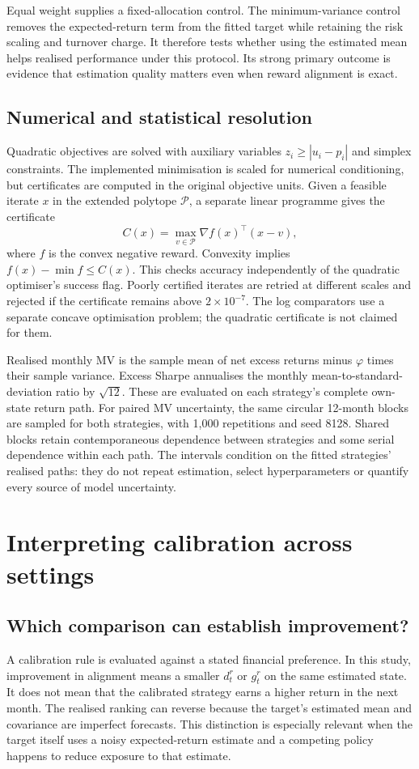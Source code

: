 \documentclass[sigconf,anonymous,review]{acmart}
\begin{document}
Equal weight supplies a fixed-allocation control. The minimum-variance control removes the expected-return term from the fitted target while retaining the risk scaling and turnover charge. It therefore tests whether using the estimated mean helps realised performance under this protocol. Its strong primary outcome is evidence that estimation quality matters even when reward alignment is exact.

\subsection{Numerical and statistical resolution}
Quadratic objectives are solved with auxiliary variables $z_i\ge |u_i-p_i|$ and simplex constraints. The implemented minimisation is scaled for numerical conditioning, but certificates are computed in the original objective units. Given a feasible iterate $x$ in the extended polytope $\mathcal P$, a separate linear programme gives the certificate
\begin{equation}
 C(x)=\max_{v\in\mathcal P}\nabla f(x)^\top(x-v),
\end{equation}
where $f$ is the convex negative reward. Convexity implies $f(x)-\min f\le C(x)$. This checks accuracy independently of the quadratic optimiser's success flag. Poorly certified iterates are retried at different scales and rejected if the certificate remains above $2\times10^{-7}$. The log comparators use a separate concave optimisation problem; the quadratic certificate is not claimed for them.

Realised monthly MV is the sample mean of net excess returns minus $\varphi$ times their sample variance. Excess Sharpe annualises the monthly mean-to-standard-deviation ratio by $\sqrt{12}$. These are evaluated on each strategy's complete own-state return path. For paired MV uncertainty, the same circular 12-month blocks are sampled for both strategies, with 1,000 repetitions and seed 8128. Shared blocks retain contemporaneous dependence between strategies and some serial dependence within each path. The intervals condition on the fitted strategies' realised paths: they do not repeat estimation, select hyperparameters or quantify every source of model uncertainty.

\section{Interpreting calibration across settings}
\subsection{Which comparison can establish improvement?}
A calibration rule is evaluated against a stated financial preference. In this study, improvement in alignment means a smaller $d_t^r$ or $g_t^r$ on the same estimated state. It does not mean that the calibrated strategy earns a higher return in the next month. The realised ranking can reverse because the target's estimated mean and covariance are imperfect forecasts. This distinction is especially relevant when the target itself uses a noisy expected-return estimate and a competing policy happens to reduce exposure to that estimate.
\end{document}
